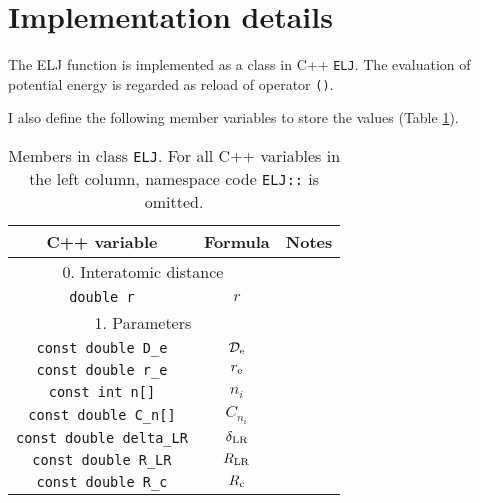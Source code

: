 \documentclass[12pt,twoside,a4paper,hidelinks]{article}
\begin{document}
\section{Implementation details }
The ELJ function is implemented as a class in C++ \verb|ELJ|.
The evaluation of potential energy is regarded as reload of operator \verb|()|.

I also define the following member variables to store the values (Table \ref{tab:v}).

\begin{table}[hp]
	\centering
	\caption{Members in class \texttt{ELJ}.  For all C++ variables in the left column, namespace code \texttt{ELJ::} is omitted. }\label{tab:v}
	\begin{tabular}{ccc}
		\hline\hline
		                C++ variable                 &                    Formula                    &             Notes             \\ \hline
		                        \multicolumn{2}{c}{0. Interatomic distance}                          &                             \\ \hline
		              \verb|double r|                &                      $r$                      &                             \\ \hline
		                             \multicolumn{2}{c}{1. Parameters}                               &                             \\ \hline
		          \verb|const double D_e|            &             $\mathcal{D}_{\rm e}$             &                             \\
		          \verb|const double r_e|            &                  $r_{\rm e}$                  &                             \\
		            \verb|const int n[]|             &                     $n_i$                     &                             \\
		         \verb|const double C_n[]|           &                   $C_{n_i}$                   &                             \\
		        \verb|const double delta_LR|         &               $\delta_{\rm LR}$               &                             \\
		          \verb|const double R_LR|           &                 $R_{\rm LR}$                  &                             \\
		          \verb|const double R_c|            &                  $R_{\rm c}$                  &                             \\

\end{tabular}
\end{table}
\end{document}
